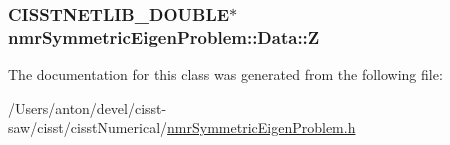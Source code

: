 \subsubsection[{Z}]{\setlength{\rightskip}{0pt plus 5cm}C\+I\+S\+S\+T\+N\+E\+T\+L\+I\+B\+\_\+\+D\+O\+U\+B\+L\+E$\ast$ nmr\+Symmetric\+Eigen\+Problem\+::\+Data\+::\+Z}\label{classnmr_symmetric_eigen_problem_1_1_data_a26f2388aec0bf6c027e7bcdd211212a2}


The documentation for this class was generated from the following file\+:\begin{DoxyCompactItemize}
\item 
/\+Users/anton/devel/cisst-\/saw/cisst/cisst\+Numerical/\hyperlink{nmr_symmetric_eigen_problem_8h}{nmr\+Symmetric\+Eigen\+Problem.\+h}\end{DoxyCompactItemize}
